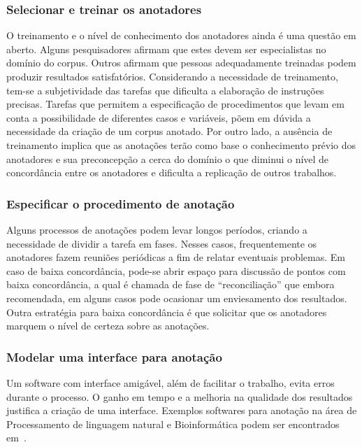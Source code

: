 

\subsubsection{Selecionar e treinar os anotadores}

O treinamento e o nível de conhecimento dos anotadores ainda é uma questão em aberto. Alguns pesquisadores afirmam que estes devem ser especialistas no domínio do corpus. Outros afirmam que pessoas adequadamente treinadas podem produzir resultados satisfatórios. 
Considerando a necessidade de treinamento, tem-se a subjetividade das tarefas que dificulta a elaboração de instruções precisas. Tarefas que permitem a especificação de procedimentos que levam em conta a possibilidade de diferentes casos e variáveis, põem em dúvida a necessidade da criação de um corpus anotado.
Por outro lado, a ausência de treinamento implica que as anotações terão como base o conhecimento prévio dos anotadores e sua preconcepção a cerca do domínio o que diminui o nível de concordância entre os anotadores e dificulta a replicação de outros trabalhos.


\subsubsection{Especificar o procedimento de anotação}
Alguns processos de anotações podem levar longos períodos, criando a necessidade de dividir a tarefa em fases. Nesses casos, frequentemente os anotadores fazem reuniões periódicas a fim de relatar eventuais problemas.  
Em caso de baixa concordância, pode-se abrir espaço para discussão de pontos com baixa concordância, a qual é chamada de fase de ``reconciliação'' que embora recomendada, em alguns casos pode ocasionar um enviesamento dos resultados. Outra estratégia para baixa concordância é que solicitar que os anotadores marquem o nível de certeza sobre as anotações.

\subsubsection{Modelar uma interface para anotação}
Um software com interface amigável, além de facilitar o trabalho, evita erros durante o processo. 
O ganho em tempo e a melhoria na qualidade dos resultados justifica a criação de uma interface. 
Exemplos softwares para anotação na área de Processamento de linguagem natural e Bioinformática podem ser encontrados em~\cite{Gruenstein2007}.



